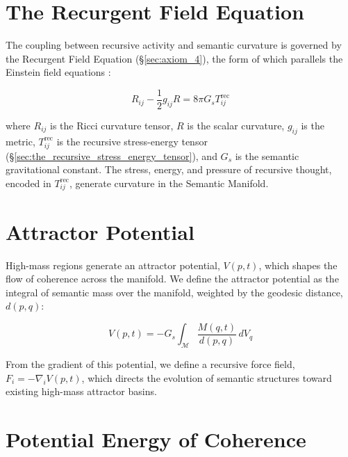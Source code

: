 \section{The Recurgent Field Equation}
\label{sec:the_recurgent_field_equation}

The coupling between recursive activity and semantic curvature is governed by the Recurgent Field Equation (\S\ref{sec:axiom_4}), the form of which parallels the Einstein field equations \autocite{Einstein1915, MisnerThorneWheeler1973, Wald1984}:

\begin{equation}
R_{ij} - \frac{1}{2}g_{ij}R = 8\pi G_s T^{\text{rec}}_{ij}
\end{equation}

where \(R_{ij}\) is the Ricci curvature tensor, \(R\) is the scalar curvature, \(g_{ij}\) is the metric, \(T^{\text{rec}}_{ij}\) is the recursive stress-energy tensor (\S\ref{sec:the_recursive_stress_energy_tensor}), and \(G_s\) is the semantic gravitational constant. The stress, energy, and pressure of recursive thought, encoded in \(T^{\text{rec}}_{ij}\), generate curvature in the Semantic Manifold.


\section{Attractor Potential}
\label{sec:attractor_potential}

High-mass regions generate an attractor potential, \(V(p,t)\), which shapes the flow of coherence across the manifold. We define the attractor potential as the integral of semantic mass over the manifold, weighted by the geodesic distance, \(d(p, q)\):

\begin{equation}
V(p, t) = -G_s \int_{\mathcal{M}} \frac{M(q, t)}{d(p, q)} \, dV_q
\end{equation}

From the gradient of this potential, we define a recursive force field, \(F_i = -\nabla_i V(p,t)\), which directs the evolution of semantic structures toward existing high-mass attractor basins.


\section{Potential Energy of Coherence}
\label{sec:potential_energy_of_coherence}

